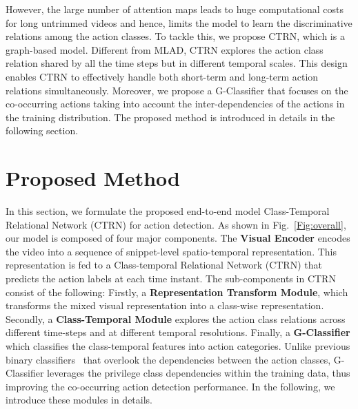 \documentclass{bmvc2k}
\begin{document}
However, the large number of attention maps leads to huge computational costs for long untrimmed videos and hence, limits the model to learn the discriminative relations among the action classes.
{To tackle this, we propose CTRN, which is a graph-based model. 
Different from MLAD, CTRN explores the action class relation shared by all the time steps but in different temporal scales. This design enables CTRN to effectively handle both short-term and long-term action relations simultaneously.  
Moreover, we propose a G-Classifier that focuses on the co-occurring actions taking into account the inter-dependencies of the actions in the training distribution.
The proposed method is introduced in details in the following section. 
}




\iffalse
\begin{figure}[ht]
\texttt{[image: Figure/Separable.PNG]}
\caption{Separable model.}
\label{Fig:separable}
\end{figure}
\fi


\section{Proposed Method}
In this section, we formulate the proposed end-to-end model Class-Temporal Relational Network (CTRN) for action detection. 
As shown in Fig.~\ref{Fig:overall}, our model is composed of four major components.
The \textbf{Visual Encoder} encodes the video into a sequence of snippet-level spatio-temporal representation. 
This representation is fed to a Class-temporal Relational Network (CTRN) that predicts the action labels at each time instant. The sub-components in CTRN consist of the following:
Firstly, a \textbf{Representation Transform Module}, which transforms the mixed visual representation into a class-wise representation. 
Secondly, a \textbf{Class-Temporal Module} explores the action class relations across different time-steps and at different temporal resolutions. 
Finally, a \textbf{G-Classifier} which classifies the class-temporal features into action categories. Unlike previous binary classifiers~\cite{superevent,TGM1} that overlook the dependencies between the action classes, G-Classifier leverages the privilege class dependencies within the training data, thus improving the co-occurring action detection performance. 
In the following, we introduce these modules in details. 
\end{document}
